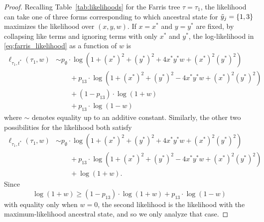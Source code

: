 \begin{proof}
Recalling Table~\ref{tab:likelihoods} for the Farris tree $\tau = \tau_1$, the likelihood can take one of three forms corresponding to which ancestral state for $\tilde{y}_j=\{1,3\}$ maximizes the likelihood over $(x,y,w)$.
If $x=x^*$ and $y=y^*$ are fixed, by collapsing like terms and ignoring terms with only $x^*$ and $y^*$, the log-likelihood in \eqref{eq:farris_likelihood} as a function of $w$ is
\begin{align*}
    \ell_{\tau_1,t^*}(\tau_1, w)
    &\sim     p_{\emptyset}  \cdot\log(1+(x^*)^2+(y^*)^2+4x^*y^*w+(x^*)^2(y^*)^2) \\
    &\qquad + p_{13}         \cdot\log(1+(x^*)^2+(y^*)^2-4x^*y^*w+(x^*)^2(y^*)^2) \\
    &\qquad + (1 - p_{13})\cdot\log(1+w) \\
    &\qquad + p_{13}\cdot\log(1-w)
\end{align*}
where $\sim$ denotes equality up to an additive constant.
Similarly, the other two possibilities for the likelihood both satisfy
\begin{align*}
    \ell_{\tau_1,t^*}(\tau_1, w)
    &\sim     p_{\emptyset}  \cdot\log(1+(x^*)^2+(y^*)^2+4x^*y^*w+(x^*)^2(y^*)^2) \\
    &\qquad + p_{13}         \cdot\log(1+(x^*)^2+(y^*)^2-4x^*y^*w+(x^*)^2(y^*)^2) \\
    &\qquad + \log(1+w).
\end{align*}
Since
$$
\log(1+w) \geq (1 - p_{13})\cdot\log(1+w) + p_{13}\cdot\log(1-w)
$$
with equality only when $w=0$, the second likelihood is the likelihood with the maximum-likelihood ancestral state, and so we only analyze that case.


\end{proof}

